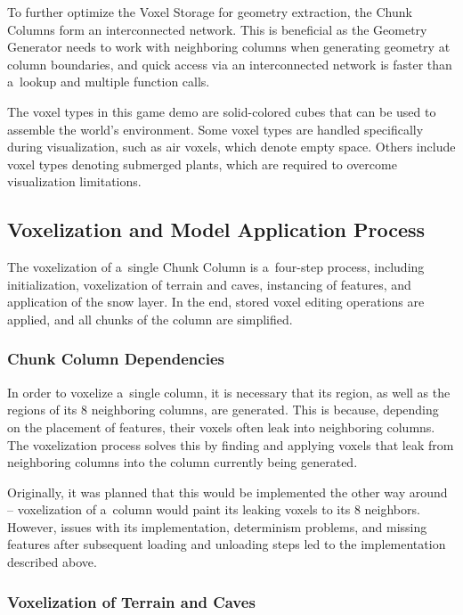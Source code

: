 To further optimize the Voxel Storage for geometry extraction, the Chunk Columns form an interconnected network. This is beneficial as the Geometry Generator needs to work with neighboring columns when generating geometry at column boundaries, and quick access via an interconnected network is faster than a~lookup and multiple function calls.

The voxel types in this game demo are solid-colored cubes that can be used to assemble the world's environment. Some voxel types are handled specifically during visualization, such as air voxels, which denote empty space. Others include voxel types denoting submerged plants, which are required to overcome visualization limitations.


\subsection{Voxelization and Model Application Process}

The voxelization of a~single Chunk Column is a~four-step process, including initialization, voxelization of terrain and caves, instancing of features, and application of the snow layer. In the end, stored voxel editing operations are applied, and all chunks of the column are simplified.

\subsubsection{Chunk Column Dependencies}

In order to voxelize a~single column, it is necessary that its region, as well as the regions of its 8 neighboring columns, are generated. This is because, depending on the placement of features, their voxels often leak into neighboring columns. The voxelization process solves this by finding and applying voxels that leak from neighboring columns into the column currently being generated.

Originally, it was planned that this would be implemented the other way around -- voxelization of a~column would paint its leaking voxels to its 8 neighbors. However, issues with its implementation, determinism problems, and missing features after subsequent loading and unloading steps led to the implementation described above.

\subsubsection{Voxelization of Terrain and Caves}

